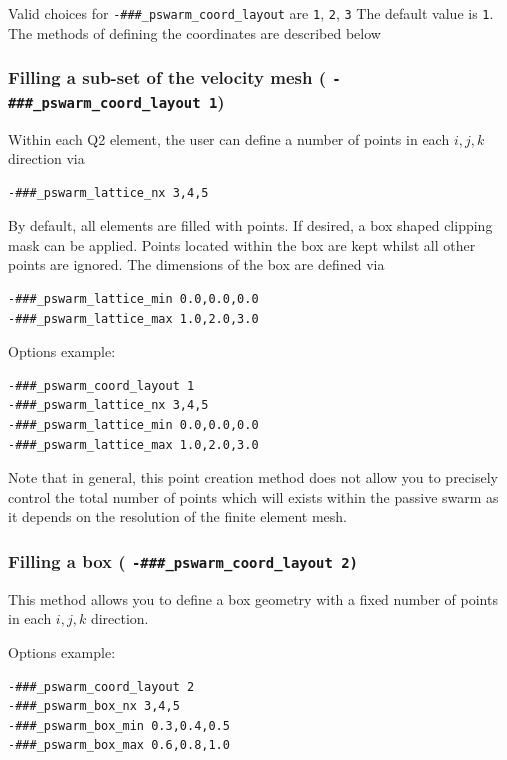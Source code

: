 \documentclass[paper=a4, fontsize=11pt,twoside]{scrartcl}
\begin{document}
{{Valid choices for \texttt{-\#\#\#\_pswarm\_coord\_layout} are \texttt{1}, \texttt{2}, \texttt{3}
The default value is \texttt{1}.
The methods of defining the coordinates are described below


\subsubsection{Filling a sub-set of the velocity mesh ( \texttt{-\#\#\#\_pswarm\_coord\_layout 1})}

Within each Q2 element, the user can define a number of points in each $i,j,k$ direction via
\begin{lstlisting}
-###_pswarm_lattice_nx 3,4,5
\end{lstlisting}

By default, all elements are filled with points.
If desired, a box shaped clipping mask can be applied. Points located within the box are kept
whilst all other points are ignored. The dimensions of the box are defined via
\begin{lstlisting}
-###_pswarm_lattice_min 0.0,0.0,0.0
-###_pswarm_lattice_max 1.0,2.0,3.0
\end{lstlisting}

Options example:
\begin{lstlisting}
-###_pswarm_coord_layout 1
-###_pswarm_lattice_nx 3,4,5
-###_pswarm_lattice_min 0.0,0.0,0.0
-###_pswarm_lattice_max 1.0,2.0,3.0
\end{lstlisting}

Note that in general, this point creation method does not allow you to precisely control the total number of points which
will exists within the passive swarm as it depends on the resolution of the finite element mesh.

\subsubsection{Filling a box ( \texttt{-\#\#\#\_pswarm\_coord\_layout 2)}}

This method allows you to define a box geometry with a fixed number of points in each $i,j,k$ direction.

Options example:
\begin{lstlisting}
-###_pswarm_coord_layout 2
-###_pswarm_box_nx 3,4,5
-###_pswarm_box_min 0.3,0.4,0.5
-###_pswarm_box_max 0.6,0.8,1.0
\end{lstlisting}

}}
\end{document}
